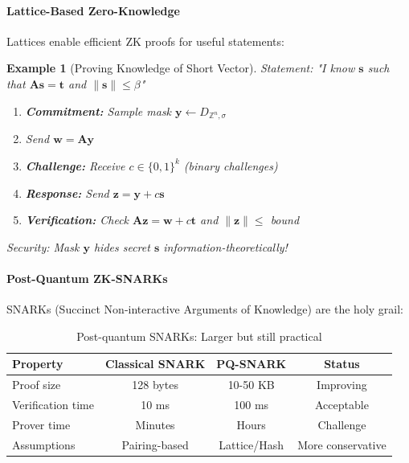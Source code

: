 \documentclass[11pt,a4paper]{article}
\newtheorem{example}{Example}
\begin{document}
\paragraph{Lattice-Based Zero-Knowledge}

Lattices enable efficient ZK proofs for useful statements:

\begin{example}[Proving Knowledge of Short Vector]
Statement: "I know $\mathbf{s}$ such that $\mathbf{As} = \mathbf{t}$ and $\|\mathbf{s}\| \leq \beta$"

\begin{enumerate}
    \item \textbf{Commitment:} Sample mask $\mathbf{y} \leftarrow D_{\mathbb{Z}^n, \sigma}$
    \item Send $\mathbf{w} = \mathbf{Ay}$
    \item \textbf{Challenge:} Receive $c \in \{0,1\}^k$ (binary challenges)
    \item \textbf{Response:} Send $\mathbf{z} = \mathbf{y} + c\mathbf{s}$
    \item \textbf{Verification:} Check $\mathbf{Az} = \mathbf{w} + c\mathbf{t}$ and $\|\mathbf{z}\| \leq$ bound
\end{enumerate}

Security: Mask $\mathbf{y}$ hides secret $\mathbf{s}$ information-theoretically!
\end{example}

\paragraph{Post-Quantum ZK-SNARKs}

SNARKs (Succinct Non-interactive Arguments of Knowledge) are the holy grail:

\begin{table}[h]
\centering
\begin{tabular}{|l|c|c|c|}
\hline
\textbf{Property} & \textbf{Classical SNARK} & \textbf{PQ-SNARK} & \textbf{Status} \\
\hline
Proof size & 128 bytes & 10-50 KB & Improving \\
Verification time & 10 ms & 100 ms & Acceptable \\
Prover time & Minutes & Hours & Challenge \\
Assumptions & Pairing-based & Lattice/Hash & More conservative \\
\hline
\end{tabular}
\caption{Post-quantum SNARKs: Larger but still practical}
\end{table}
\end{document}
